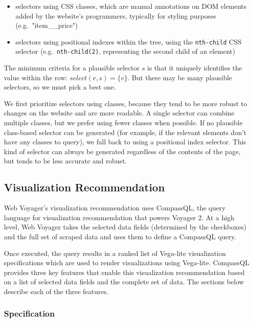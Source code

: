 \documentclass{vgtc}                          %
\begin{document}
\begin{itemize}
\item
  selectors using CSS classes, which are manual annotations on DOM
  elements added by the website's programmers, typically for styling
  purposes (e.g.~"item\_\_price")
\item
  selectors using positional indexes within the tree, using the
  \texttt{nth-child} CSS selector (e.g.~\texttt{nth-child(2)},
  representing the second child of an element)
\end{itemize}

The minimum criteria for a plausible selector \(s\) is that it uniquely
identifies the value within the row: \(select(r, s) = \{v\}\). But there
may be many plausible selectors, so we must pick a best one.

We first prioritize selectors using classes, because they tend to be
more robust to changes on the website and are more readable. A single
selector can combine multiple classes, but we prefer using fewer classes
when possible. If no plausible class-based selector can be generated
(for example, if the relevant elements don't have any classes to query),
we fall back to using a positional index selector. This kind of selector
can always be generated regardless of the contents of the page, but
tends to be less accurate and robust.

\subsection{Visualization Recommendation}

Web Voyager's visualization recommendation uses CompassQL, the query
language for visualization recommendation that powers Voyager 2. At a
high level, Web Voyager takes the selected data fields (determined by
the checkboxes) and the full set of scraped data and uses them to define
a CompassQL query.

Once executed, the query results in a ranked list of Vega-lite
\cite{satyanarayan2017} visualization specifications which are used to
render visualizations using Vega-lite. CompassQL provides three key
features that enable this visualization recommendation based on a list
of selected data fields and the complete set of data. The sections below
describe each of the three features.

\subsubsection{Specification}
\end{document}
